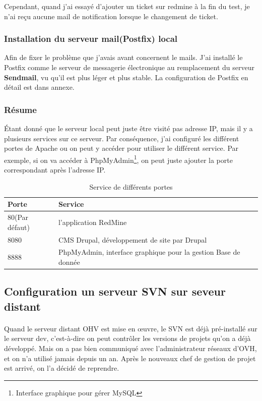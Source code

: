 Cependant, quand j'ai essayé d'ajouter un ticket sur redmine à la fin du test, je n'ai reçu aucune  mail de notification lorsque le changement de ticket.

\subsubsection{Installation du serveur mail(Postfix) local}
Afin de fixer le problème que j'avais avant concernent le mails. J'ai installé le Postfix comme le serveur de messagerie électronique au remplacement du serveur \textbf{Sendmail}, vu qu'il est plus léger et plus stable. La configuration de Postfix en détail est dans annexe.

\subsubsection{Résume}
Étant donné que le serveur local peut juste être visité pas adresse IP, mais il y a plusieurs services sur ce serveur. Par conséquence, j'ai configuré les différent portes de Apache ou on peut y accéder pour utiliser le différent service. Par exemple, si on va accéder à PhpMyAdmin\footnote{Interface graphique pour gérer MySQL}, on peut juste ajouter la porte correspondant après l'adresse IP.

\begin{table}[htbp]
\centering
\begin{tabular}{ll}
  \toprule
  Porte & Service\\
  \midrule
	80(Par défaut) & l'application RedMine \\ 	 
	8080 & CMS Drupal, développement de site par Drupal \\ 	 
	8888 & PhpMyAdmin, interface graphique pour la gestion Base de donnée \\ 	 
  \bottomrule
\end{tabular}
 \caption{Service de différents portes}
\end{table}

\subsection{Configuration un serveur SVN sur seveur distant}
\paragraph{}
Quand le serveur distant OHV est mise en œuvre, le SVN est déjà pré-installé sur le serveur dev, c'est-à-dire on peut contrôler les versions de projets qu'on a déjà développé. Mais on a pas bien communiqué avec l'administrateur réseaux d'OVH, et on n'a utilisé jamais depuis un an. Après le nouveaux chef de gestion de projet est arrivé, on l'a décidé de reprendre. 

